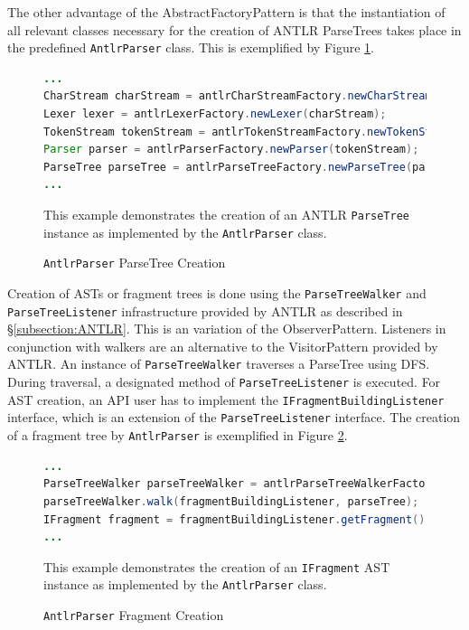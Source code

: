 The other advantage of the \gls{AbstractFactoryPattern} is that the instantiation of all relevant classes necessary for the creation of \gls{ANTLR} \glspl{ParseTree} takes place in the predefined \texttt{AntlrParser} class.
This is exemplified by Figure \ref{figure:AntlrParserParseTreeCreation}.

\begin{figure}[h!]
\begin{lstlisting}[language=Java]
...
CharStream charStream = antlrCharStreamFactory.newCharStream(inputStream);
Lexer lexer = antlrLexerFactory.newLexer(charStream);
TokenStream tokenStream = antlrTokenStreamFactory.newTokenStream(lexer);
Parser parser = antlrParserFactory.newParser(tokenStream);
ParseTree parseTree = antlrParseTreeFactory.newParseTree(parser);
...
\end{lstlisting}
{
\scriptsize
This example demonstrates the creation of an \gls{ANTLR} \texttt{ParseTree} instance as implemented by the \texttt{AntlrParser} class.
}
\caption{\texttt{AntlrParser} \gls{ParseTree} Creation}
\label{figure:AntlrParserParseTreeCreation}
\end{figure}

Creation of \glspl{AST} or fragment trees is done using the \texttt{ParseTreeWalker} and \texttt{ParseTreeListener} infrastructure provided by \gls{ANTLR} as described in §\ref{subsection:ANTLR}.
This is an variation of the \gls{ObserverPattern}.
Listeners in conjunction with walkers are an alternative to the \gls{VisitorPattern} provided by \gls{ANTLR}.
An instance of \texttt{Parse\-Tree\-Walker} traverses a \gls{ParseTree} using \gls{DFS}.
During traversal, a designated method of \texttt{Parse\-Tree\-Listener} is executed.
For \gls{AST} creation, an \gls{API} user has to implement the \texttt{IFragmentBuildingListener} interface, which is an extension of the \texttt{ParseTreeListener} interface.
The creation of a fragment tree by \texttt{AntlrParser} is exemplified in Figure \ref{figure:AntlrParserFragmentCreation}.

\begin{figure}[h!]
\begin{lstlisting}[language=Java]
...
ParseTreeWalker parseTreeWalker = antlrParseTreeWalkerFactory.newParseTreeWalker();
parseTreeWalker.walk(fragmentBuildingListener, parseTree);
IFragment fragment = fragmentBuildingListener.getFragment();
...
\end{lstlisting}
{
\scriptsize
This example demonstrates the creation of an \texttt{IFragment} \gls{AST} instance as implemented by the \texttt{AntlrParser} class.
}
\caption{\texttt{AntlrParser} Fragment Creation}
\label{figure:AntlrParserFragmentCreation}
\end{figure}

